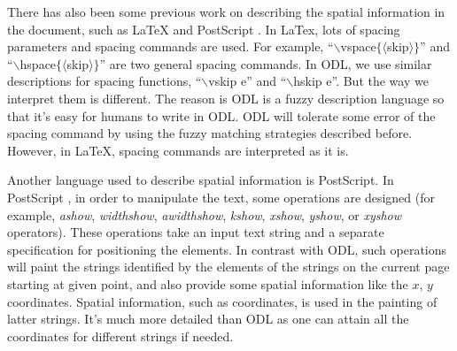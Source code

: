 There has also been some 
previous work on describing the spatial information in the document, 
such as LaTeX \cite{lamport1986document} and 
PostScript \cite{taft1999post}. In LaTex, 
lots of spacing parameters and spacing commands are used. 
For example, ``$\backslash$vspace$\lbrace\langle$skip$\rangle\rbrace$'' and 
``$\backslash$hspace$\lbrace\langle$skip$\rangle\rbrace$'' 
are two general spacing commands. 
In ODL, 
we use similar descriptions for spacing functions, ``$\backslash$vskip e'' 
and ``$\backslash$hskip e''. But the way we interpret them is different. 
The reason is ODL is a fuzzy description language so that it's easy for 
humans to write in ODL. ODL will tolerate some error of the spacing 
command by using the fuzzy matching strategies described before. 
However, in LaTeX, spacing commands are interpreted as it is. 

Another language used to describe spatial information is PostScript. 
In PostScript \cite{taft1999post}, in order to manipulate the text, some 
operations are designed (for example, {\em ashow}, {\em widthshow}, 
{\em awidthshow}, {\em kshow}, {\em xshow}, {\em yshow}, or 
{\em xyshow} operators). These operations take an input text 
string and a separate specification for positioning the elements. 
In contrast with ODL, such operations will paint the strings identified by the elements 
of the strings on the current page starting at given point, and also 
provide some spatial information like the $x$, $y$ coordinates. Spatial 
information, such as coordinates, is used in the painting of latter strings. 
It's much more detailed than ODL as one can attain all the coordinates 
for different strings if needed. 

